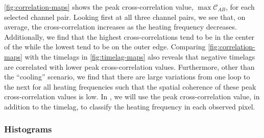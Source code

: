 \autoref{fig:correlation-maps} shows the peak cross-correlation value, $\max\mathcal{C}_{AB}$, for each selected channel pair. Looking first at all three channel pairs, we see that, on average, the cross-correlation increases as the heating frequency decreases. Additionally, we find that the highest cross-correlations tend to be in the center of the \AR{} while the lowest tend to be on the outer edge. Comparing \autoref{fig:correlation-maps} with the timelags in \autoref{fig:timelag-maps} also reveals that negative timelags are correlated with lower peak cross-correlation values. Furthermore, other than the ``cooling'' scenario, we find that there are large variations from one loop to the next for all heating frequencies such that the spatial coherence of these peak cross-correlation values is low. In , we will use the peak cross-correlation value, in addition to the timelag, to classify the heating frequency in each observed pixel.

\subsubsection{Histograms}\label{histograms}

